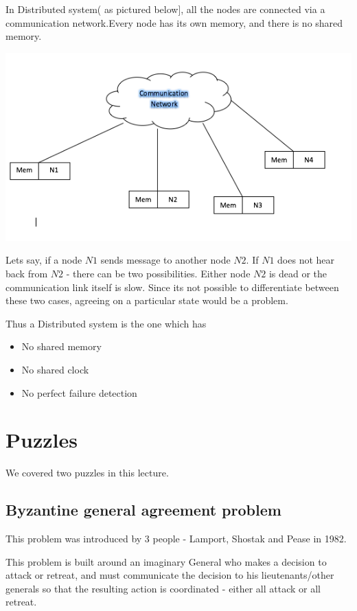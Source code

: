 \documentclass[twoside]{article}
\begin{document}
In Distributed system( as pictured below], all the nodes are connected via a communication network.Every node has its own memory, and there  is no shared memory.

\includegraphics[scale=0.7]{images/distributed.png}

Lets say, if a node $N1$ sends message to another node $N2$. If $N1$ does not hear back from $N2$ - there can be two possibilities. Either node $N2$ is dead or the communication link itself is slow. Since its not possible to differentiate between these two cases, agreeing on a particular state would be a problem.

Thus a Distributed system is the one which has
\begin{itemize}
   \item No shared memory
   \item No shared clock
   \item No perfect failure detection
\end{itemize}




\section{Puzzles}
We covered two puzzles in this lecture.
\subsection{Byzantine general agreement problem}

This problem was introduced by 3 people - Lamport, Shostak and Pease in 1982.

This problem is built around an imaginary General who makes a decision to attack or retreat, and must communicate the decision to his lieutenants/other generals so that the resulting action is coordinated - either all attack or all retreat.
\end{document}
